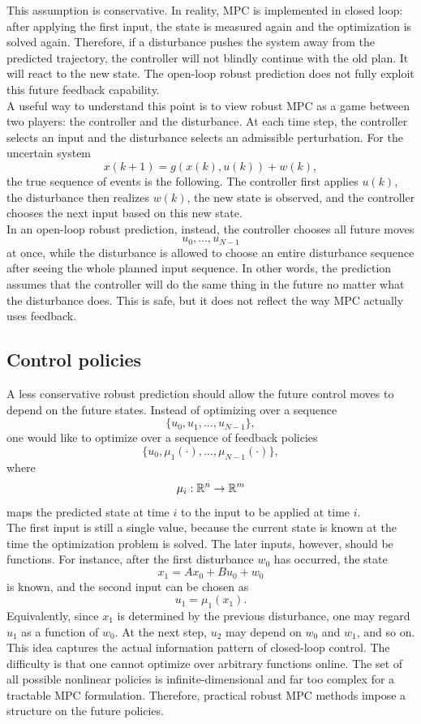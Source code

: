 This assumption is conservative. In reality, MPC is implemented in closed loop: after applying
the first input, the state is measured again and the optimization is solved again. Therefore, if a
disturbance pushes the system away from the predicted trajectory, the controller will not blindly
continue with the old plan. It will react to the new state. The open-loop robust prediction does
not fully exploit this future feedback capability.\\
A useful way to understand this point is to view robust MPC as a game between two players:
the controller and the disturbance. At each time step, the controller selects an input and the
disturbance selects an admissible perturbation. For the uncertain system
\[
    x(k+1)=g(x(k),u(k))+w(k),
\]
the true sequence of events is the following. The controller first applies \(u(k)\), the disturbance
then realizes \(w(k)\), the new state is observed, and the controller chooses the next input based
on this new state.\\

In an open-loop robust prediction, instead, the controller chooses all future moves
\[
    u_0,\ldots,u_{N-1}
\]
at once, while the disturbance is allowed to choose an entire disturbance sequence after seeing
the whole planned input sequence. In other words, the prediction assumes that the controller
will do the same thing in the future no matter what the disturbance does. This is safe, but it
does not reflect the way MPC actually uses feedback.

\subsection{Control policies}

A less conservative robust prediction should allow the future control moves to depend on the
future states. Instead of optimizing over a sequence
\[
    \{u_0,u_1,\ldots,u_{N-1}\},
\]
one would like to optimize over a sequence of feedback policies
\[
    \{u_0,\mu_1(\cdot),\ldots,\mu_{N-1}(\cdot)\},
\]
where
\[
    \mu_i:\mathbb{R}^n\to\mathbb{R}^m
\]
maps the predicted state at time \(i\) to the input to be applied at time \(i\).\\

The first input is still a single value, because the current state is known at the time the
optimization problem is solved. The later inputs, however, should be functions. For instance,
after the first disturbance \(w_0\) has occurred, the state
\[
    x_1=Ax_0+Bu_0+w_0
\]
is known, and the second input can be chosen as
\[
    u_1=\mu_1(x_1).
\]
Equivalently, since \(x_1\) is determined by the previous disturbance, one may regard \(u_1\) as
a function of \(w_0\). At the next step, \(u_2\) may depend on \(w_0\) and \(w_1\), and so on.\\
This idea captures the actual information pattern of closed-loop control. The difficulty is that
one cannot optimize over arbitrary functions online. The set of all possible nonlinear policies is
infinite-dimensional and far too complex for a tractable MPC formulation. Therefore, practical
robust MPC methods impose a structure on the future policies.

